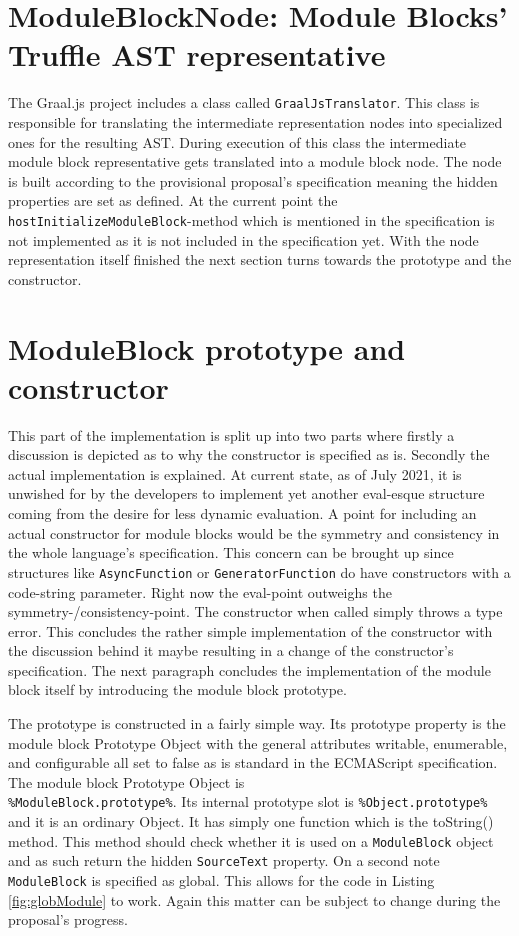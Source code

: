 \section{ModuleBlockNode: Module Blocks' Truffle AST representative}

The Graal.js project includes a class called \texttt{GraalJsTranslator}. This class is responsible for translating the intermediate representation nodes into specialized ones for the resulting AST. During execution of this class the intermediate module block representative gets translated into a module block node. The node is built according to the provisional proposal's specification meaning the hidden properties are set as defined. At the current point the \texttt{hostInitializeModuleBlock}-method which is mentioned in the specification is not implemented as it is not included in the specification yet. With the node representation itself finished the next section turns towards the prototype and the constructor.

\section{ModuleBlock prototype and constructor}

This part of the implementation is split up into two parts where firstly a discussion is depicted as to why the constructor is specified as is. Secondly the actual implementation is explained. At current state, as of July 2021, it is unwished for by the developers to implement yet another eval-esque structure coming from the desire for less dynamic evaluation. A point for including an actual constructor for module blocks would be the symmetry and consistency in the whole language's specification. This concern can be brought up since structures like \texttt{AsyncFunction} or \texttt{GeneratorFunction} do have constructors with a code-string parameter. Right now the eval-point outweighs the symmetry-/consistency-point. The constructor when called simply throws a type error. This concludes the rather simple implementation of the constructor with the discussion behind it maybe resulting in a change of the constructor's specification. The next paragraph concludes the implementation of the module block itself by introducing the module block prototype.

The prototype is constructed in a fairly simple way. Its prototype property is the module block Prototype Object with the general attributes writable, enumerable, and configurable all set to false as is standard in the ECMAScript specification. The module block Prototype Object is \\ \texttt{\%ModuleBlock.prototype\%}. Its internal prototype slot is \texttt{\%Object.prototype\%} and it is an ordinary Object. It has simply one function which is the toString() method. This method should check whether it is used on a \texttt{ModuleBlock} object and as such return the hidden \texttt{SourceText} property.
On a second note \texttt{ModuleBlock} is specified as global. This allows for the code in Listing \ref{fig:globModule} to work. Again this matter can be subject to change during the proposal's progress.

